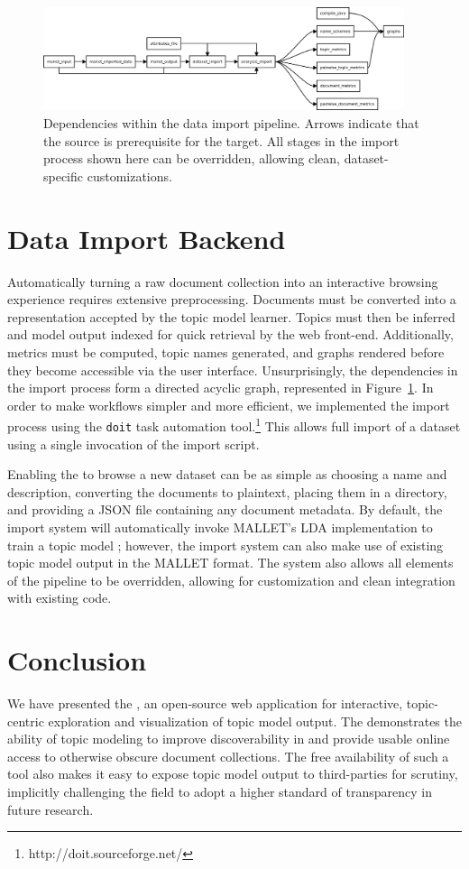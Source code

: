 \documentclass[11pt]{article}
\begin{document}
\begin{figure}[ht]
 \centering
 \includegraphics[width=400px,keepaspectratio=true]{./build_flowchart2.png}
 \caption{Dependencies within the data import pipeline. Arrows indicate that the source is prerequisite for the target.
All stages in the import process shown here can be overridden, allowing clean, dataset-specific customizations.}
 \label{fig:build_flowchart}
\end{figure}
\section{Data Import Backend}
Automatically turning a raw document collection into an interactive browsing
experience requires extensive preprocessing. Documents must be converted into a
representation accepted by the topic model learner. Topics must then be inferred
and model output indexed for quick retrieval by the web front-end.
Additionally, metrics must be computed, topic names generated, and graphs rendered
before they become accessible via the user interface. Unsurprisingly, the dependencies
in the import process form a directed acyclic graph, represented in Figure~\ref{fig:build_flowchart}.
In order to make workflows simpler and more efficient, we implemented
the import process using the \texttt{doit} task automation tool.\footnote{http://doit.sourceforge.net/}
This allows full import of a dataset using a single invocation of the import script.

Enabling the \tool{} to browse a new dataset can be as simple as choosing a name
and description, converting the documents to plaintext, placing them in a
directory, and providing a JSON file containing any document metadata. By default,
the \tool{} import system will automatically invoke MALLET's LDA implementation to train a
topic model \cite{McCallum2002}; however, the import system can also make use of
existing topic model output in the MALLET format. The system also allows all
elements of the pipeline to be overridden, allowing for customization and
clean integration with existing code.

\section{Conclusion}
We have presented the \tool, an open-source web application for interactive,
topic-centric exploration and visualization of topic model output. The \tool{}
demonstrates the ability of topic modeling to improve discoverability in and
provide usable online access to otherwise obscure document collections. The free
availability of such a tool also makes it easy to expose topic model output to
third-parties for scrutiny, implicitly challenging the field to adopt a higher
standard of transparency in future research.


\end{document}
